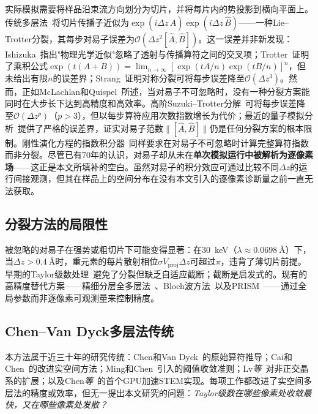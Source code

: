 \documentclass[twoside,11pt]{ctexart}
\begin{document}
实际模拟需要将样品沿束流方向划分为切片，并将每片内的势投影到横向平面上。传统多层法~\cite{Kirkland2020,CowleyMoodie1957}将切片传播子近似为$\exp(i\Delta z\,\hat A)\exp(i\Delta z\,\hat B)$——一种Lie--Trotter分裂，其每步对易子误差为$\mathcal O(\Delta z^2[\hat A,\hat B])$。这一误差并非新发现：Ishizuka~\cite{IshizukaUyeda1977}指出"物理光学近似"忽略了透射与传播算符之间的交叉项；Trotter~\cite{Trotter1959}证明了乘积公式$\exp(t(A+B))=\lim_{n\to\infty}[\exp(tA/n)\exp(tB/n)]^n$，但未给出有限$n$的误差界；Strang~\cite{Strang1968}证明对称分裂可将每步误差降至$\mathcal O(\Delta z^3)$。然而，正如McLachlan和Quispel~\cite{McLachlanQuispel2002}所述，当对易子不可忽略时，没有一种分裂方案能同时在大步长下达到高精度和高效率。高阶Suzuki--Trotter分解~\cite{Suzuki1990}可将每步误差降至$\mathcal O(\Delta z^p)$（$p>3$），但以每步算符应用次数指数增长为代价；最近的量子模拟分析~\cite{Childs2021}提供了严格的误差界，证实对易子范数$\|[\hat A,\hat B]\|$仍是任何分裂方案的根本限制。刚性演化方程的指数积分器~\cite{HochbruckOstermann2010}同样要求在对易子不可忽略时计算完整算符指数而非分裂。尽管已有70年的认识，对易子却从未在\textbf{单次模拟运行中被解析为逐像素场}——这正是本文所填补的空白。虽然对易子的积分效应可通过比较不同$\Delta z$的运行间接观测，但其在样品上的空间分布在没有本文引入的逐像素诊断量之前一直无法获取。

\subsection{分裂方法的局限性}

被忽略的对易子在强势或粗切片下可能变得显著：在\SI{30}{\keV}（$\lambda\approx\SI{0.0698}{\angstrom}$）下，当$\Delta z>\SI{0.4}{\angstrom}$时，重元素的每片散射相位$\sigma V_\text{proj}\Delta z$可超过$\pi$，违背了薄切片前提。早期的Taylor级数处理~\cite{ChenVanDyck1997,VanDyck1975}避免了分裂但缺乏自适应截断；截断是启发式的。现有的高精度替代方案——精细分层全多层法~\cite{MadsenSusi2021,Ophus2017,LobatoVanDyck2015}、Bloch波方法~\cite{Kirkland2020}以及PRISM~\cite{Ophus2017}——通过全局参数而非逐像素可观测量来控制精度。

\subsection{Chen--Van Dyck多层法传统}

本方法属于近三十年的研究传统：Chen和Van Dyck~\cite{ChenVanDyck1997}的原始算符推导；Cai和Chen~\cite{CaiChen2012}的改进实空间方法；Ming和Chen~\cite{MingChen2013}引入的阈值收敛准则；Lv\textit{等}~\cite{Lv2016}对非正交晶系的扩展；以及Chen\textit{等}~\cite{Chen2025}的首个GPU加速STEM实现。每项工作都改进了实空间多层法的精度或效率，但无一提出本文研究的问题：\textit{Taylor级数在哪些像素处收敛最快，又在哪些像素处发散？}
\end{document}
